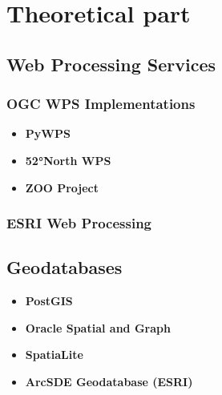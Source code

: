 \chapter{Theoretical part}
\label{2-teorie}




\section{Web Processing Services}




\subsection{OGC WPS Implementations}

\begin{itemize}
\item \textbf{PyWPS}
	
  
	
\item \textbf{52°North WPS}
	
  

\item \textbf{ZOO Project}
	
\end{itemize}
  


\subsection{ESRI Web Processing}

\section{Geodatabases}

\begin{itemize}
\item \textbf{PostGIS}
	
\item \textbf{Oracle Spatial and Graph}
	
\item \textbf{SpatiaLite}

\item \textbf{ArcSDE Geodatabase (ESRI)}
	
\end{itemize}